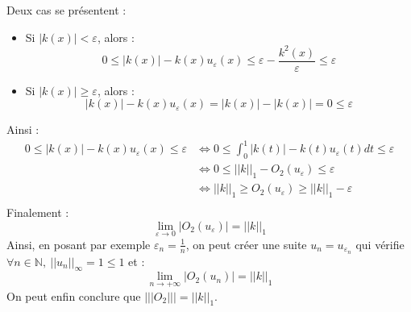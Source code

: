 \documentclass[a4paper,11pt]{article}
\theoremstyle{plain}
\theoremstyle{definition}
\begin{document}
\begin{itemize}
Deux cas se présentent :
\begin{itemize}
\item Si $|k(x)| < \varepsilon$, alors :
\[
	0 \leq |k(x)| - k(x)u_\varepsilon(x) \leq \varepsilon - \frac{k^2(x)}{\varepsilon} \leq \varepsilon
\]
\item Si $|k(x)| \geq \varepsilon$, alors :
\[
	|k(x)| - k(x)u_\varepsilon(x) = |k(x)| - |k(x)| = 0 \leq \varepsilon
\]
\end{itemize}
Ainsi :
\[
\begin{aligned}
	0 \leq |k(x)| - k(x)u_\varepsilon(x) \leq \varepsilon & \Leftrightarrow 0 \leq \int_0^1 |k(t)| - k(t)u_\varepsilon(t)dt \leq \varepsilon\\
	& \Leftrightarrow 0 \leq ||k||_1 - O_2(u_\varepsilon) \leq \varepsilon\\
	& \Leftrightarrow ||k||_1 \geq O_2(u_\varepsilon) \geq ||k||_1 - \varepsilon \\
\end{aligned}
\]
Finalement :
\[
 \lim_{\varepsilon \to 0} |O_2(u_\varepsilon)| = ||k||_1
\]
Ainsi, en posant par exemple $\varepsilon_n = \frac{1}{n}$, on peut créer une suite $u_n = u_{\varepsilon_n}$ qui vérifie $\forall n \in \mathbb{N}, \ ||u_n||_\infty = 1 \leq 1$ et :
\[
 \lim_{n \to +\infty} |O_2(u_n)| = ||k||_1
\]
On peut enfin conclure que $|||O_2||| = ||k||_1$.
\end{itemize}

\end{document}

